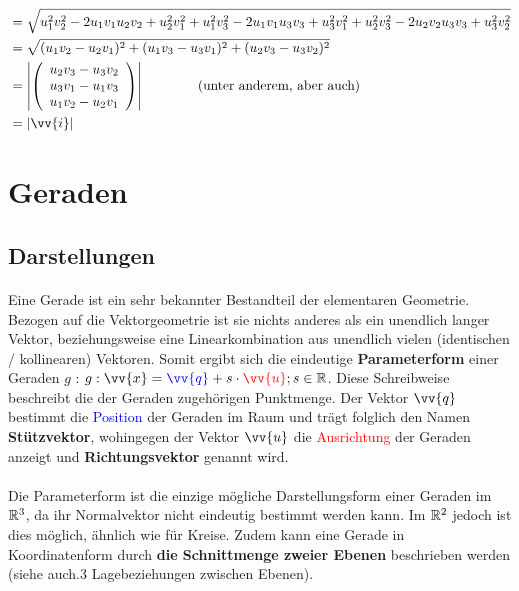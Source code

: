 \begin{Beweis}
\begin{align*}
                                                        &= \sqrt{u_1^2v_2^2 - 2u_1v_1u_2v_2 + u_2^2v_1^2 + u_1^2v_3^2 - 2u_1v_1u_3v_3 + u_3^2v_1^2 + u_2^2v_3^2 - 2u_2v_2u_3v_3 + u_3^2v_2^2} \\
                                                        &= \sqrt{(u_1v_2 - u_2v_1)^2 + (u_1v_3 - u_3v_1)^2 + (u_2v_3 - u_3v_2)^2} \\
                                                        &= \left|\left(\begin{array}{c} u_2v_3 - u_3v_2 \\ u_3v_1 - u_1v_3 \\ u_1v_2 - u_2v_1 \end{array}\right)\right| \qquad \qquad \text{(unter anderem, aber auch)} \\
                                                        &= |\vv{i}|
        \end{align*}
    \end{Beweis}


\section{Geraden}

    \subsection{Darstellungen}

        \paragraph{} Eine Gerade ist ein sehr bekannter Bestandteil der elementaren Geometrie. Bezogen auf die Vektorgeometrie ist sie nichts anderes als ein
        unendlich langer Vektor, beziehungsweise eine Linearkombination aus unendlich vielen (identischen / kollinearen) Vektoren. Somit ergibt sich die
        eindeutige \textbf{Parameterform} einer Geraden $g$ : \quad$g:\vv{x}=\textcolor{blue}{\vv{q}}+s\cdot\textcolor{red}{\vv{u}};s\in\R$. Diese Schreibweise
        beschreibt die der Geraden zugehörigen Punktmenge. Der Vektor $\vv{q}$ bestimmt die \textcolor{blue}{Position} der Geraden im Raum und trägt folglich
        den Namen \textbf{Stützvektor}, wohingegen der Vektor $\vv{u}$ die \textcolor{red}{Ausrichtung} der Geraden anzeigt und \textbf{Richtungsvektor} genannt
        wird.
        \\
        \begin{Bemerkung}
            \paragraph{} Die Parameterform ist die einzige mögliche Darstellungsform einer Geraden im $\mathbb{R}^3$, da ihr Normalvektor nicht eindeutig bestimmt
            werden kann. Im $\mathbb{R}^2$ jedoch ist dies möglich, ähnlich wie für Kreise. Zudem kann eine Gerade in Koordinatenform durch \textbf{die
            Schnittmenge zweier Ebenen} beschrieben werden (siehe auch.3 Lagebeziehungen zwischen Ebenen\grqq).
        \end{Bemerkung}

